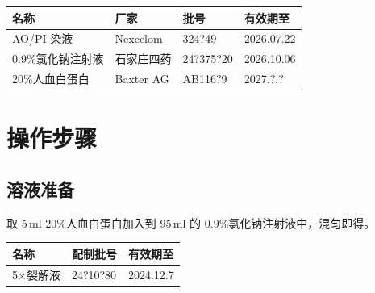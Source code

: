 \documentclass[UTF8,10pt,a4paper,fontset=fandol]{ctexart}
\newcommand{\fieldvalue}[1]{#1}
\newcommand{\handwritten}[1]{#1}
\begin{document}
\begin{tabularx}{\textwidth}{|p{3.3cm}|p{2.8cm}|X|p{2.6cm}|}
\hline
名称 & 厂家 & 批号 & 有效期至 \\ \hline
\fieldvalue{AO/PI 染液} &
\fieldvalue{Nexcelom} &
\fieldvalue{\handwritten{324?49}} &
\fieldvalue{\handwritten{2026.07.22}}
\\ \hline
\fieldvalue{0.9\%氯化钠注射液} &
\fieldvalue{石家庄四药} &
\fieldvalue{\handwritten{24?375?20}} &
\fieldvalue{\handwritten{2026.10.06}}
\\ \hline
\fieldvalue{20\%人血白蛋白} &
\fieldvalue{Baxter AG} &
\fieldvalue{\handwritten{AB116?9}} &
\fieldvalue{\handwritten{2027.?.?}}
\\ \hline
\end{tabularx}

\section{操作步骤}

\subsection*{溶液准备}

取 5\,ml 20\%人血白蛋白加入到 95\,ml 的 0.9\%氯化钠注射液中，混匀即得。

\begin{tabularx}{\textwidth}{|p{3.2cm}|X|p{3.2cm}|}
\hline
名称 & 配制批号 & 有效期至 \\ \hline
\fieldvalue{5$\times$裂解液} &
\fieldvalue{\handwritten{24?10?80}} &
\fieldvalue{\handwritten{2024.12.7}}
\\ \hline
\end{tabularx}
\end{document}
